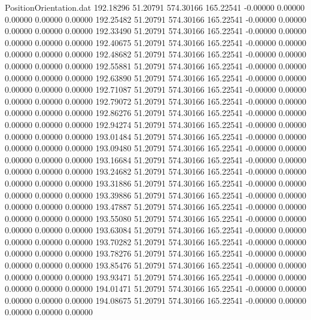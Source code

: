 \begin{filecontents}{PositionOrientation.dat}
 192.18296   51.20791  574.30166   165.22541   -0.00000    0.00000    0.00000    0.00000    0.00000
 192.25482   51.20791  574.30166   165.22541   -0.00000    0.00000    0.00000    0.00000    0.00000
 192.33490   51.20791  574.30166   165.22541   -0.00000    0.00000    0.00000    0.00000    0.00000
 192.40675   51.20791  574.30166   165.22541   -0.00000    0.00000    0.00000    0.00000    0.00000
 192.48682   51.20791  574.30166   165.22541   -0.00000    0.00000    0.00000    0.00000    0.00000
 192.55881   51.20791  574.30166   165.22541   -0.00000    0.00000    0.00000    0.00000    0.00000
 192.63890   51.20791  574.30166   165.22541   -0.00000    0.00000    0.00000    0.00000    0.00000
 192.71087   51.20791  574.30166   165.22541   -0.00000    0.00000    0.00000    0.00000    0.00000
 192.79072   51.20791  574.30166   165.22541   -0.00000    0.00000    0.00000    0.00000    0.00000
 192.86276   51.20791  574.30166   165.22541   -0.00000    0.00000    0.00000    0.00000    0.00000
 192.94274   51.20791  574.30166   165.22541   -0.00000    0.00000    0.00000    0.00000    0.00000
 193.01484   51.20791  574.30166   165.22541   -0.00000    0.00000    0.00000    0.00000    0.00000
 193.09480   51.20791  574.30166   165.22541   -0.00000    0.00000    0.00000    0.00000    0.00000
 193.16684   51.20791  574.30166   165.22541   -0.00000    0.00000    0.00000    0.00000    0.00000
 193.24682   51.20791  574.30166   165.22541   -0.00000    0.00000    0.00000    0.00000    0.00000
 193.31886   51.20791  574.30166   165.22541   -0.00000    0.00000    0.00000    0.00000    0.00000
 193.39886   51.20791  574.30166   165.22541   -0.00000    0.00000    0.00000    0.00000    0.00000
 193.47887   51.20791  574.30166   165.22541   -0.00000    0.00000    0.00000    0.00000    0.00000
 193.55080   51.20791  574.30166   165.22541   -0.00000    0.00000    0.00000    0.00000    0.00000
 193.63084   51.20791  574.30166   165.22541   -0.00000    0.00000    0.00000    0.00000    0.00000
 193.70282   51.20791  574.30166   165.22541   -0.00000    0.00000    0.00000    0.00000    0.00000
 193.78276   51.20791  574.30166   165.22541   -0.00000    0.00000    0.00000    0.00000    0.00000
 193.85476   51.20791  574.30166   165.22541   -0.00000    0.00000    0.00000    0.00000    0.00000
 193.93471   51.20791  574.30166   165.22541   -0.00000    0.00000    0.00000    0.00000    0.00000
 194.01471   51.20791  574.30166   165.22541   -0.00000    0.00000    0.00000    0.00000    0.00000
 194.08675   51.20791  574.30166   165.22541   -0.00000    0.00000    0.00000    0.00000    0.00000

\end{filecontents}
